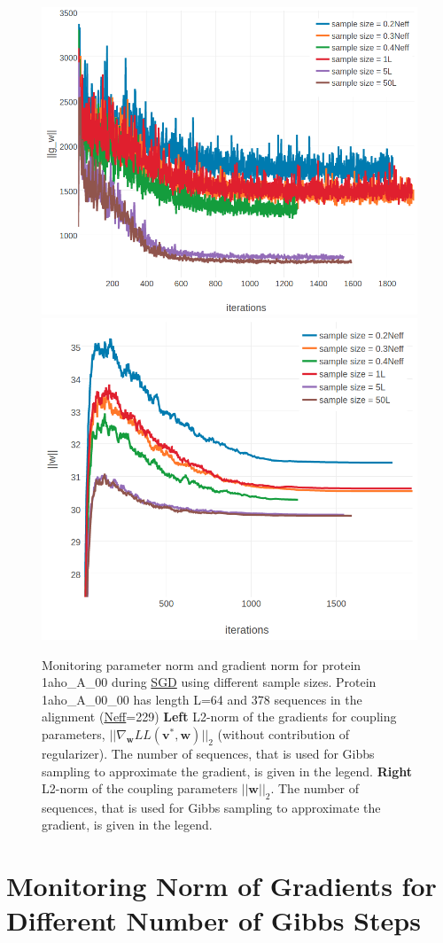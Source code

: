 \documentclass[11pt,a4paper,twoside]{book}
\renewcommand{\v}{\mathbf{v}}
\newcommand{\w}{\mathbf{w}}
\theoremstyle{definition}
\theoremstyle{definition}
\theoremstyle{remark}
\begin{document}
\begin{figure}

{\centering \includegraphics[width=0.5\linewidth]{img/full_likelihood/appendix/1ahoa00_gradient_norm_for_samplesizes} \includegraphics[width=0.5\linewidth]{img/full_likelihood/appendix/1ahoa00_parameter_norm_for_samplesizes} 

}

\caption{Monitoring parameter norm and
gradient norm for protein 1aho\_A\_00 during
\protect\hyperlink{abbrev}{SGD} using different sample sizes. Protein
1aho\_A\_00\_00 has length L=64 and 378 sequences in the alignment
(\protect\hyperlink{abbrev}{Neff}=229) \textbf{Left} L2-norm of the
gradients for coupling parameters, \(||\nabla_{\w} L\!L(\v^*, \w)||_2\)
(without contribution of regularizer). The number of sequences, that is
used for Gibbs sampling to approximate the gradient, is given in the
legend. \textbf{Right} L2-norm of the coupling parameters \(||\w||_2\).
The number of sequences, that is used for Gibbs sampling to approximate
the gradient, is given in the legend.}\label{fig:cd-samplesize-protein1ahoa00}
\end{figure}

\section{Monitoring Norm of Gradients for Different Number of Gibbs
Steps}\label{monitoring-norm-of-gradients-for-different-number-of-gibbs-steps}
\end{document}
